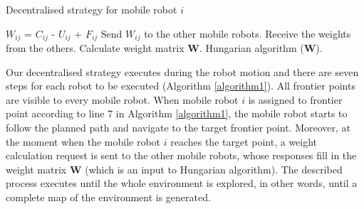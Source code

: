 \begin{algorithm}[H]
\caption{Decentralised strategy for mobile robot $i$}
\label{algorithm1}
\begin{algorithmic}[1]
\State\hspace{\algorithmicindent} $W_{ij}$ = $C_{ij}$ - $U_{ij}$ + $F_{ij}$
\State\hspace{\algorithmicindent} Send $W_{ij}$ to the other mobile robots.
\State \hspace{\algorithmicindent} Receive the weights from the others.
\State \hspace{\algorithmicindent} Calculate weight matrix $\boldsymbol{W}$.
\State \hspace{\algorithmicindent} Hungarian algorithm ($\boldsymbol{W}$).
\EndFor
\end{algorithmic}
\end{algorithm}

Our decentralised strategy executes during the robot motion and there are seven steps for each robot to be executed (Algorithm \ref{algorithm1}).  All frontier points are visible to every mobile robot.
When mobile robot $i$ is assigned to frontier point according to line 7 in Algorithm \ref{algorithm1}, the mobile robot starts to follow the planned path and navigate to the target frontier point. Moreover, at the moment when the mobile robot $i$ reaches the target point, a weight calculation request is sent to the other mobile robots, whose responses fill in the weight matrix $\boldsymbol{W}$ (which is an input to Hungarian algorithm). The described process executes until the whole environment is explored, in other words, until a complete  map of the environment is generated.
